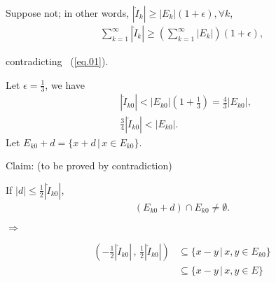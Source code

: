\documentclass[UTF8,a4paper,10pt]{article}
\begin{document}
\begin{solution}
\begin{mybox}{}

  Suppose not; in other words, \(|\mathring{I}_{k}|\geq|E_{k}|(1+\epsilon), \forall k\),
  \begin{equation*}
    \begin{aligned}
  \sum_{k = 1}^{\infty}|\mathring{I}_k|\geq\left(\sum_{k = 1}^{\infty}|E_k|\right)(1+\epsilon),
    \end{aligned}
  \end{equation*}
    
    contradicting ~(\ref{eq.01}).

\end{mybox}


  Let \(\epsilon = \frac{1}{3}\), we have
  \begin{equation*}
    \begin{aligned}
      &|\mathring{I}_{k0}|<|E_{k0}|(1+\frac{1}{3}) = \frac{4}{3}|E_{k0}|,\\
      &\frac{3}{4}|\mathring{I}_{k0}|<|E_{k0}|.
    \end{aligned}
  \end{equation*}
Let \(E_{k0} + d = \{x+d \,|\, x\in E_{k0} \}\).

Claim: (to be proved by contradiction)

If \(|d| \leq \frac{1}{2}|\mathring{I}_{k0}|\),
\begin{equation*}
  \begin{aligned}
    (E_{k0} + d)\cap E_{k0} \neq \emptyset.
  \end{aligned}
\end{equation*}

\(\Rightarrow \)

\begin{equation*}
  \begin{aligned}
    \left(-\frac{1}{2}|\mathring{I}_{k0}|\,,\,\frac{1}{2}|\mathring{I}_{k0}|\right)&\subseteq\{x-y\,|\,x,y \in E_{k0}\}\\
    &\subseteq \{x-y\,|\,x,y \in E\}
  \end{aligned}
\end{equation*}


  
\end{solution}

\pagebreak
\end{document}
